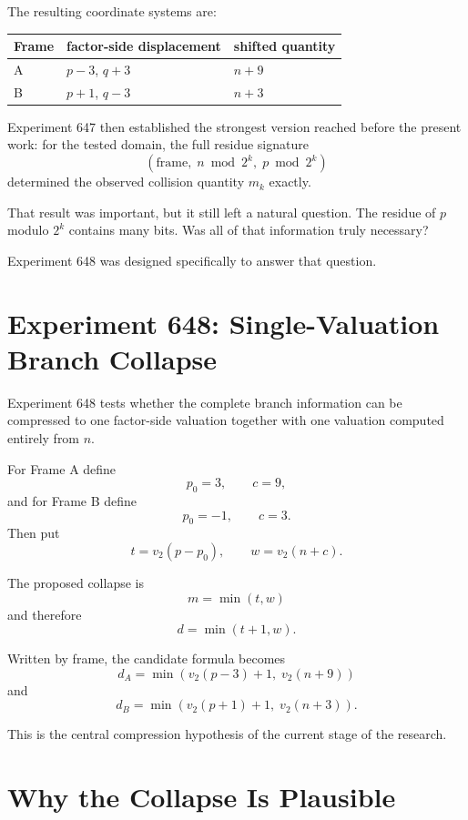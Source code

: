 \documentclass[11pt,a4paper]{article}
\newcommand{\vTwo}{v_2}
\begin{document}
The resulting coordinate systems are:

\begin{center}
\begin{tabular}{lll}
\toprule
Frame & factor-side displacement & shifted quantity \\
\midrule
A & $p-3$, $q+3$ & $n+9$ \\
B & $p+1$, $q-3$ & $n+3$ \\
\bottomrule
\end{tabular}
\end{center}

Experiment 647 then established the strongest version reached before the present work: for the tested domain, the full residue signature
\[
    (\text{frame},\;n\bmod 2^k,\;p\bmod 2^k)
\]
determined the observed collision quantity $m_k$ exactly.

That result was important, but it still left a natural question. The residue of $p$ modulo $2^k$ contains many bits. Was all of that information truly necessary?

Experiment 648 was designed specifically to answer that question.

\section{Experiment 648: Single-Valuation Branch Collapse}

Experiment 648 tests whether the complete branch information can be compressed to one factor-side valuation together with one valuation computed entirely from $n$.

For Frame A define
\[
    p_0=3,
    \qquad c=9,
\]
and for Frame B define
\[
    p_0=-1,
    \qquad c=3.
\]
Then put
\[
    t=\vTwo(p-p_0),
    \qquad
    w=\vTwo(n+c).
\]

The proposed collapse is
\[
    \boxed{m=\min(t,w)}
\]
and therefore
\[
    \boxed{d=\min(t+1,w)}.
\]

Written by frame, the candidate formula becomes
\[
    \boxed{
    d_A=
    \min\left(\vTwo(p-3)+1,\;\vTwo(n+9)\right)
    }
\]
and
\[
    \boxed{
    d_B=
    \min\left(\vTwo(p+1)+1,\;\vTwo(n+3)\right)
    }.
\]

This is the central compression hypothesis of the current stage of the research.

\section{Why the Collapse Is Plausible}
\end{document}
